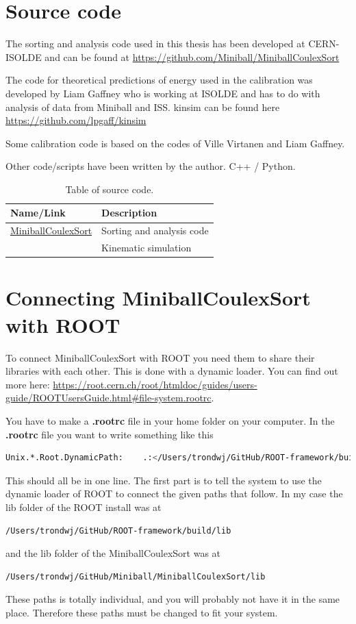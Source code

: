 \documentclass[twoside,english]{uiofysmaster/uiofysmaster}
\begin{document}
\begin{appendices}
\chapter{Source code}
The sorting and analysis code used in this thesis has been developed at CERN-ISOLDE and can be found at \url{https://github.com/Miniball/MiniballCoulexSort}

The code for theoretical predictions of energy used in the calibration was developed by Liam Gaffney who is working at ISOLDE and has to do with analysis of data from Miniball and ISS. kinsim can be found here \url{https://github.com/lpgaff/kinsim}

Some calibration code is based on the codes of Ville Virtanen and Liam Gaffney. 

Other code/scripts have been written by the author. C++ / Python.

\begin{table}[h]
  \centering
  \caption{Table of source code.}
    \begin{tabular}{ll}
        \hline
        Name/Link & Description \\
        \hline
         \href{https://github.com/Miniball/MiniballCoulexSort}{MiniballCoulexSort} & Sorting and analysis code \\
         \href{https://github.com/lpgaff/kinsim} & Kinematic simulation \\
        \hline
    \end{tabular}
    \label{tab:code}
\end{table}


\chapter{Connecting MiniballCoulexSort with ROOT}
To connect MiniballCoulexSort with ROOT you need them to share their libraries with each other. This is done with a dynamic loader. You can find out more here: \url{https://root.cern.ch/root/htmldoc/guides/users-guide/ROOTUsersGuide.html#file-system.rootrc}. 

You have to make a \textbf{.rootrc} file in your home folder on your computer. In the \textbf{.rootrc} file you want to write something like this 
\begin{lstlisting}[language=sh]
Unix.*.Root.DynamicPath:    .:</Users/trondwj/GitHub/ROOT-framework/build/lib>:/Users/trondwj/GitHub/Miniball/MiniballCoulexSort/lib:
\end{lstlisting}
This should all be in one line. The first part is to tell the system to use the dynamic loader of ROOT to connect the given paths that follow. In my case the lib folder of the ROOT install was at 
\begin{lstlisting}[language=sh]
/Users/trondwj/GitHub/ROOT-framework/build/lib
\end{lstlisting}
and the lib folder of the MiniballCoulexSort was at
\begin{lstlisting}[language=sh]
/Users/trondwj/GitHub/Miniball/MiniballCoulexSort/lib
\end{lstlisting}
These paths is totally individual, and you will probably not have it in the same place. Therefore these paths must be changed to fit your system. 


\end{appendices}
\end{document}
